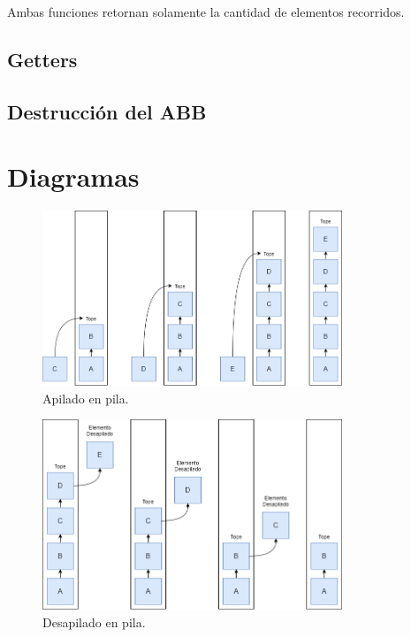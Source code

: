 \documentclass[titlepage,a4paper]{article}
\begin{document}
Ambas funciones retornan solamente la cantidad de elementos recorridos.


											\subsection{Getters}




											\subsection{Destrucción del ABB}



\section{Diagramas}\label{sec:diagramas}

\begin{figure}[H]
\centering
\includegraphics[width=0.8\textwidth]{pila_apilado.png}
\caption{\label{fig:seq01}Apilado en pila.}
\end{figure}


\begin{figure}[H]
\centering
\includegraphics[width=0.8\textwidth]{pila_desapilado.png}
\caption{\label{fig:seq02}Desapilado en pila.}
\end{figure}
\end{document}
